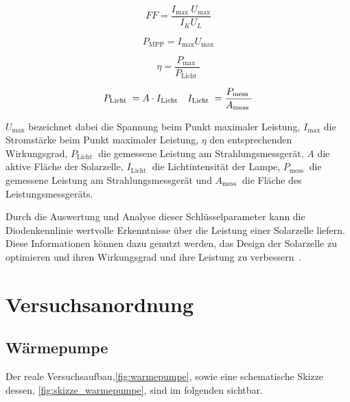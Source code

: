 \documentclass[12pt,english,ngerman]{scrartcl}
\begin{document}
\begin{equation}
	FF=\frac{I_{\text {max }} U_{\max }}{I_K U_L}
	\label{eq:I_fuellfaktor}
\end{equation}

\begin{equation}
	P_\text{MPP} =I_{\max } U_{\max }
	\label{eq:leistung_max}
\end{equation}

\begin{equation}
	\eta=\frac{P_{\text {max }}}{P_{\text {Licht }}}
	\label{eq:wirkungsgrad_solar}
\end{equation}

\begin{equation}
	P_{\text {Licht }}=A \cdot I_{\text {Licht}} \quad I_{\text {Licht }}=\frac{P_{\text {mess }}}{A_{\text {mess }}} \\
	\label{eq:leistung_solar}
\end{equation}

$U_{\max}$ bezeichnet dabei die Spannung beim Punkt maximaler Leistung,
$I_{\max}$ die Stromstärke beim Punkt maximaler Leistung,
$\eta$ den entsprechenden Wirkungsgrad,
$P_{\text {Licht }}$ die gemessene Leistung am Strahlungsmessgerät,
$A$ die aktive Fläche der Solarzelle,
$I_{\text {Licht }}$ die Lichtintensität der Lampe,
$P_{\text {mess }} $ die gemessene Leistung am Strahlungsmessgerät und
$A_{\text {mess }} $ die Fläche des Leistungsmessgeräts.

Durch die Auswertung und Analyse dieser Schlüsselparameter kann die
Diodenkennlinie wertvolle Erkenntnisse über die Leistung einer Solarzelle
liefern. Diese Informationen können dazu genutzt werden, das Design der
Solarzelle zu optimieren und ihren Wirkungsgrad und ihre Leistung zu
verbessern~\cite{knoll_solarzelle_nodate}.

\section{Versuchsanordnung}\label{sec:versuchsanordnung}

\subsection{Wärmepumpe}

Der reale Versuchsaufbau,\autoref{fig:warmepumpe}, sowie eine schematische
Skizze dessen, \autoref{fig:skizze_warmepumpe}, sind im folgenden sichtbar.
\end{document}
